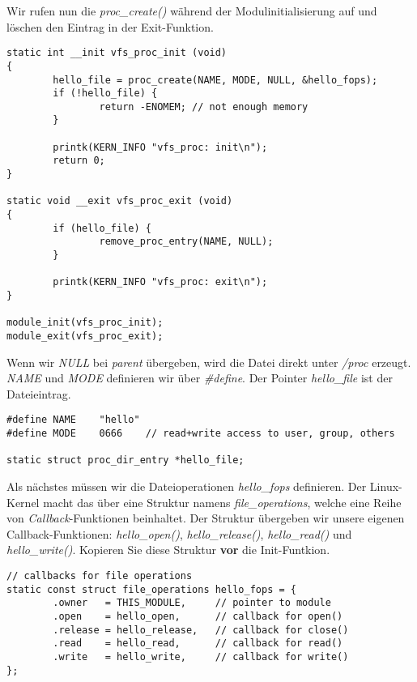 Wir rufen nun die \emph{proc\_create()} während der Modulinitialisierung auf und löschen den Eintrag in der Exit-Funktion.
\begin{lstlisting}
static int __init vfs_proc_init (void)
{
        hello_file = proc_create(NAME, MODE, NULL, &hello_fops);
        if (!hello_file) {
                return -ENOMEM; // not enough memory
        }

        printk(KERN_INFO "vfs_proc: init\n");
        return 0;
}

static void __exit vfs_proc_exit (void)
{
        if (hello_file) {
                remove_proc_entry(NAME, NULL);
        }

        printk(KERN_INFO "vfs_proc: exit\n");
}

module_init(vfs_proc_init);
module_exit(vfs_proc_exit);
\end{lstlisting} 

Wenn wir \emph{NULL} bei \emph{parent} übergeben, wird die Datei direkt unter \emph{/proc} erzeugt.
\emph{NAME} und \emph{MODE} definieren wir über \emph{\#define}. Der Pointer \emph{hello\_file} ist der Dateieintrag.
\begin{lstlisting}
#define NAME    "hello"
#define MODE    0666    // read+write access to user, group, others

static struct proc_dir_entry *hello_file;
\end{lstlisting}

Als nächstes müssen wir die Dateioperationen \emph{hello\_fops} definieren. Der Linux-Kernel macht das über eine Struktur
namens \emph{file\_operations}, welche eine Reihe von \emph{Callback}-Funktionen beinhaltet. Der Struktur übergeben wir
unsere eigenen Callback-Funktionen: \emph{hello\_open()}, \emph{hello\_release()}, \emph{hello\_read()} und \emph{hello\_write()}.
Kopieren Sie diese Struktur \textbf{vor} die Init-Funtkion.

\begin{lstlisting}
// callbacks for file operations
static const struct file_operations hello_fops = {
        .owner   = THIS_MODULE,     // pointer to module
        .open    = hello_open,      // callback for open()
        .release = hello_release,   // callback for close()
        .read    = hello_read,      // callback for read()
        .write   = hello_write,     // callback for write()
};
\end{lstlisting}

